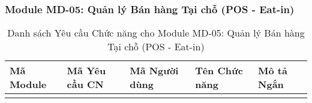 \subsubsection{Module MD-05: Quản lý Bán hàng Tại chỗ (POS - Eat-in)}


\begin{longtable}{|m{2cm}|m{2.5cm}|m{2.5cm}|m{4.5cm}|m{4cm}|}
\caption{Danh sách Yêu cầu Chức năng cho Module MD-05: Quản lý Bán hàng Tại chỗ (POS - Eat-in)} \label{tab:fr_md05} \\
\hline
\textbf{Mã Module} & \textbf{Mã Yêu cầu CN} & \textbf{Mã Người dùng} & \textbf{Tên Chức năng} & \textbf{Mô tả Ngắn} \\
\hline
\endhead %

\hline
\endfoot %

\hline
\endlastfoot %


\end{longtable}

